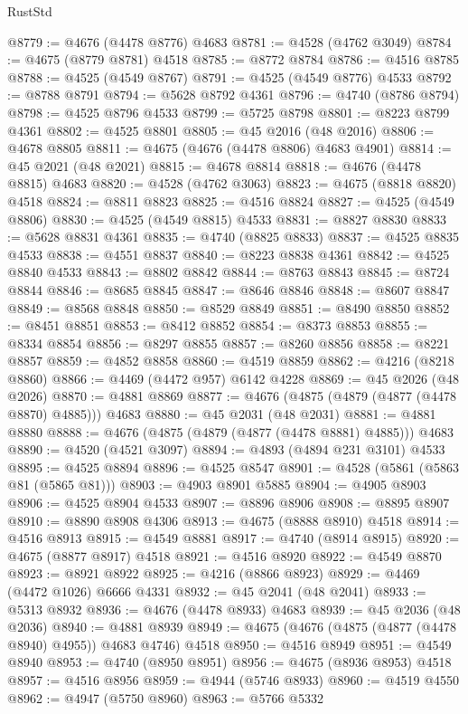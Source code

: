 \begin{lexlean}{RustStd}
\begin{coremodule}
@8779 := @4676 (@4478 @8776) @4683
@8781 := @4528 (@4762 @3049)
@8784 := @4675 (@8779 @8781) @4518
@8785 := @8772 @8784
@8786 := @4516 @8785
@8788 := @4525 (@4549 @8767)
@8791 := @4525 (@4549 @8776) @4533
@8792 := @8788 @8791
@8794 := @5628 @8792 @4361
@8796 := @4740 (@8786 @8794)
@8798 := @4525 @8796 @4533
@8799 := @5725 @8798
@8801 := @8223 @8799 @4361
@8802 := @4525 @8801
@8805 := @45 @2016 (@48 @2016)
@8806 := @4678 @8805
@8811 := @4675 (@4676 (@4478 @8806) @4683 @4901)
@8814 := @45 @2021 (@48 @2021)
@8815 := @4678 @8814
@8818 := @4676 (@4478 @8815) @4683
@8820 := @4528 (@4762 @3063)
@8823 := @4675 (@8818 @8820) @4518
@8824 := @8811 @8823
@8825 := @4516 @8824
@8827 := @4525 (@4549 @8806)
@8830 := @4525 (@4549 @8815) @4533
@8831 := @8827 @8830
@8833 := @5628 @8831 @4361
@8835 := @4740 (@8825 @8833)
@8837 := @4525 @8835 @4533
@8838 := @4551 @8837
@8840 := @8223 @8838 @4361
@8842 := @4525 @8840 @4533
@8843 := @8802 @8842
@8844 := @8763 @8843
@8845 := @8724 @8844
@8846 := @8685 @8845
@8847 := @8646 @8846
@8848 := @8607 @8847
@8849 := @8568 @8848
@8850 := @8529 @8849
@8851 := @8490 @8850
@8852 := @8451 @8851
@8853 := @8412 @8852
@8854 := @8373 @8853
@8855 := @8334 @8854
@8856 := @8297 @8855
@8857 := @8260 @8856
@8858 := @8221 @8857
@8859 := @4852 @8858
@8860 := @4519 @8859
@8862 := @4216 (@8218 @8860)
@8866 := @4469 (@4472 @957) @6142 @4228
@8869 := @45 @2026 (@48 @2026)
@8870 := @4881 @8869
@8877 := @4676 (@4875 (@4879 (@4877 (@4478 @8870) @4885))) @4683
@8880 := @45 @2031 (@48 @2031)
@8881 := @4881 @8880
@8888 := @4676 (@4875 (@4879 (@4877 (@4478 @8881) @4885))) @4683
@8890 := @4520 (@4521 @3097)
@8894 := @4893 (@4894 @231 @3101) @4533
@8895 := @4525 @8894
@8896 := @4525 @8547
@8901 := @4528 (@5861 (@5863 @81 (@5865 @81)))
@8903 := @4903 @8901 @5885
@8904 := @4905 @8903
@8906 := @4525 @8904 @4533
@8907 := @8896 @8906
@8908 := @8895 @8907
@8910 := @8890 @8908 @4306
@8913 := @4675 (@8888 @8910) @4518
@8914 := @4516 @8913
@8915 := @4549 @8881
@8917 := @4740 (@8914 @8915)
@8920 := @4675 (@8877 @8917) @4518
@8921 := @4516 @8920
@8922 := @4549 @8870
@8923 := @8921 @8922
@8925 := @4216 (@8866 @8923)
@8929 := @4469 (@4472 @1026) @6666 @4331
@8932 := @45 @2041 (@48 @2041)
@8933 := @5313 @8932
@8936 := @4676 (@4478 @8933) @4683
@8939 := @45 @2036 (@48 @2036)
@8940 := @4881 @8939
@8949 := @4675 (@4676 (@4875 (@4877 (@4478 @8940) @4955)) @4683 @4746) @4518
@8950 := @4516 @8949
@8951 := @4549 @8940
@8953 := @4740 (@8950 @8951)
@8956 := @4675 (@8936 @8953) @4518
@8957 := @4516 @8956
@8959 := @4944 (@5746 @8933)
@8960 := @4519 @4550
@8962 := @4947 (@5750 @8960)
@8963 := @5766 @5332

\end{coremodule}
\end{lexlean}
